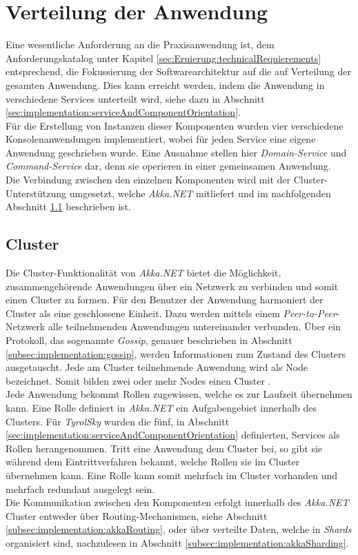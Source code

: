 \section{Verteilung der Anwendung}
\label{subsec:implementation:ApplicationDistribution}
Eine wesentliche Anforderung an die Praxisanwendung ist, dem Anforderungskatalog unter Kapitel \ref{sec:Eruierung:technicalRequierements} entsprechend, die Fokussierung der Softwarearchitektur auf die auf Verteilung der gesamten Anwendung. Dies kann erreicht werden, indem die Anwendung in verschiedene Services unterteilt wird, siehe dazu in Abschnitt \ref{sec:implementation:serviceAndComponentOrientation}. \\
Für die Erstellung von Instanzen dieser Komponenten wurden vier verschiedene Konsolenanwendungen implementiert, wobei für jeden Service eine eigene Anwendung geschrieben wurde. Eine Ausnahme stellen hier \textit{Domain-Service} und \textit{Command-Service} dar, denn sie operieren in einer gemeinsamen Anwendung. \\
Die Verbindung zwischen den einzelnen Komponenten wird mit der Cluster-Unterstützung umgesetzt, welche \textit{Akka.NET} mitliefert und im nachfolgenden Abschnitt \ref{subsec:implementation:akka:cluster} beschrieben ist. 

\subsection{Cluster}
\label{subsec:implementation:akka:cluster}
Die Cluster-Funktionalität von \textit{Akka.NET} bietet die Möglichkeit, zusammengehörende Anwendungen über ein Netzwerk zu verbinden und somit einen Cluster zu formen. Für den Benutzer der Anwendung harmoniert der Cluster als eine geschlossene Einheit. Dazu werden mittels einem \textit{Peer-to-Peer}-Netzwerk alle teilnehmenden Anwendungen untereinander verbunden. Über ein Protokoll, das sogenannte \textit{Gossip}, genauer beschrieben in Abschnitt \ref{subsec:implementation:gossip}, werden Informationen zum Zustand des Clusters ausgetauscht. Jede am Cluster teilnehmende Anwendung wird als Node bezeichnet. Somit bilden zwei oder mehr Nodes einen Cluster \citep{akkaInAction}. \\
Jede Anwendung bekommt Rollen zugewissen, welche es zur Laufzeit übernehmen kann. Eine Rolle definiert in \textit{Akka.NET} ein Aufgabengebiet innerhalb des Clusters. Für \textit{TyrolSky} wurden die fünf, in Abschnitt \ref{sec:implementation:serviceAndComponentOrientation} definierten, Services als Rollen herangenommen. Tritt eine Anwendung dem Cluster bei, so gibt sie während dem Eintrittverfahren bekannt, welche Rollen sie im Cluster übernehmen kann. Eine Rolle kann somit mehrfach im Cluster vorhanden und mehrfach redundant ausgelegt sein. \\
Die Kommunikation zwischen den Komponenten erfolgt innerhalb des \textit{Akka.NET} Cluster entweder über Routing-Mechanismen, siehe Abschnitt \ref{subsec:implementation:akkaRouting}, oder über verteilte Daten, welche in \textit{Shards} organisiert sind, nachzulesen in Abschnitt \ref{subsec:implementation:akkaSharding}. 

